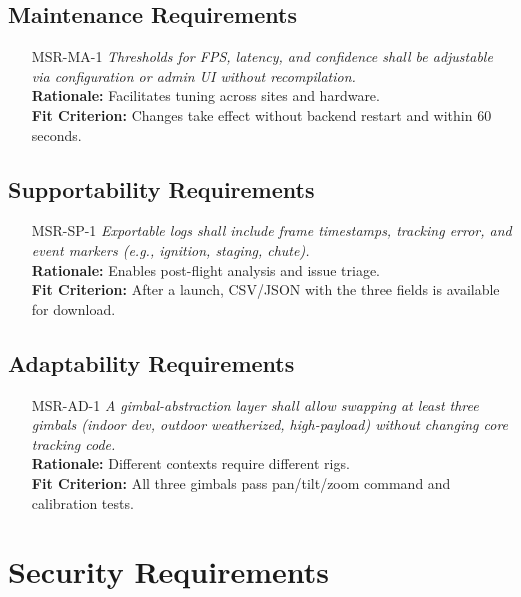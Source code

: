 \documentclass[12pt]{article}
\begin{document}
\subsection{Maintenance Requirements}
\begin{itemize}[leftmargin=*]
  \item[MSR-MA-1] \emph{Thresholds for FPS, latency, and confidence shall be adjustable via configuration or admin UI without recompilation.}\\
  \textbf{Rationale:} Facilitates tuning across sites and hardware.\\
  \textbf{Fit Criterion:} Changes take effect without backend restart and within 60 seconds.
\end{itemize}

\subsection{Supportability Requirements}
\begin{itemize}[leftmargin=*]
  \item[MSR-SP-1] \emph{Exportable logs shall include frame timestamps, tracking error, and event markers (e.g., ignition, staging, chute).}\\
  \textbf{Rationale:} Enables post-flight analysis and issue triage.\\
  \textbf{Fit Criterion:} After a launch, CSV/JSON with the three fields is available for download.
\end{itemize}

\subsection{Adaptability Requirements}
\begin{itemize}[leftmargin=*]
  \item[MSR-AD-1] \emph{A gimbal-abstraction layer shall allow swapping at least three gimbals (indoor dev, outdoor weatherized, high-payload) without changing core tracking code.}\\
  \textbf{Rationale:} Different contexts require different rigs.\\
  \textbf{Fit Criterion:} All three gimbals pass pan/tilt/zoom command and calibration tests.
\end{itemize}

\section{Security Requirements}
\end{document}
